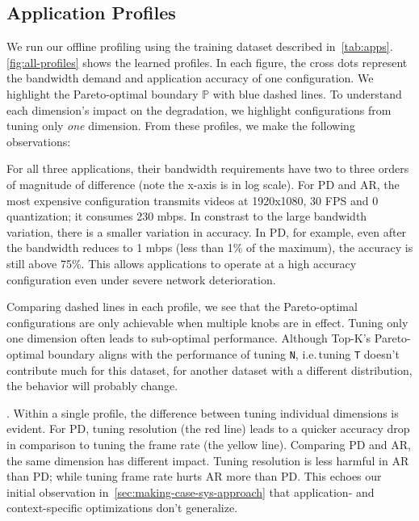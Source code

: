 \subsection{Application Profiles}
\label{sec:application-profiles}

We run our offline profiling using the training dataset described
in~\autoref{tab:apps}.  \autoref{fig:all-profiles} shows the learned
profiles. In each figure, the cross dots represent the bandwidth demand and
application accuracy of one configuration. We highlight the Pareto-optimal
boundary $\mathbb{P}$ with blue dashed lines. To understand each dimension's
impact on the degradation, we highlight configurations from tuning only
\textit{one} dimension. From these profiles, we make the following observations:

 For all three applications, their bandwidth
requirements have two to three orders of magnitude of difference (note the
x-axis is in log scale). For PD and AR, the most expensive configuration
transmits videos at 1920x1080, 30 FPS and 0 quantization; it consumes 230 mbps. In
constrast to the large bandwidth variation, there is a smaller variation in
accuracy. In PD, for example, even after the bandwidth reduces to 1 mbps (less
than 1\% of the maximum), the accuracy is still above 75\%. This allows
\sysname{} applications to operate at a high accuracy configuration even under
severe network deterioration.

 Comparing dashed lines in each
profile, we see that the Pareto-optimal configurations are only achievable when
multiple knobs are in effect. Tuning only one dimension often leads to
sub-optimal performance. Although Top-K's Pareto-optimal boundary aligns with
the performance of tuning \texttt{N}, i.e.\,tuning \texttt{T} doesn't contribute
much for this dataset, for another dataset with a different distribution,
the behavior will probably change.

. Within a single profile, the
difference between tuning individual dimensions is evident. For PD, tuning
resolution (the red line) leads to a quicker accuracy drop in comparison to
tuning the frame rate (the yellow line). Comparing PD and AR, the same dimension
has different impact. Tuning resolution is less harmful in AR than PD; while
tuning frame rate hurts AR more than PD\@. This echoes our initial observation
in~\autoref{sec:making-case-sys-approach} that application- and context-specific
optimizations don't generalize.

